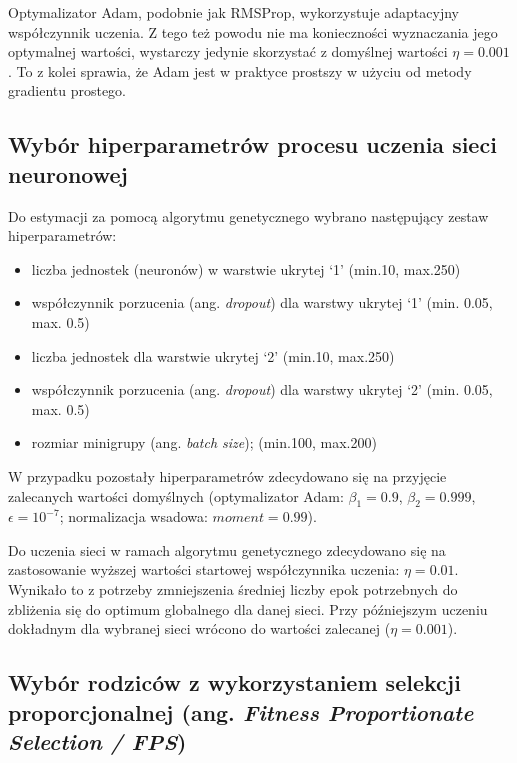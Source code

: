 \documentclass[a4paper,11pt]{article}
\begin{document}
    \bigskip

    Optymalizator Adam, podobnie jak RMSProp, wykorzystuje adaptacyjny współczynnik uczenia. Z tego też powodu nie ma konieczności wyznaczania jego optymalnej wartości, wystarczy jedynie skorzystać z domyślnej wartości $\eta = 0.001$\cite{UczenieMaszynowe2018}. To z kolei sprawia, że Adam jest w praktyce prostszy w użyciu od metody gradientu prostego.

    \subsection{Wybór hiperparametrów procesu uczenia sieci neuronowej}

    Do estymacji za pomocą algorytmu genetycznego wybrano następujący zestaw hiperparametrów:
    \begin{itemize}
        \item liczba jednostek (neuronów) w warstwie ukrytej `1' (min.10, max.250)
        \item współczynnik porzucenia (ang. \textit{dropout}) dla warstwy ukrytej `1' (min. 0.05, max. 0.5)
        \item liczba jednostek dla warstwie ukrytej `2' (min.10, max.250)
        \item współczynnik porzucenia (ang. \textit{dropout}) dla warstwy ukrytej `2' (min. 0.05, max. 0.5)
        \item rozmiar minigrupy (ang. \textit{batch size}); (min.100, max.200)
    \end{itemize}

    \bigskip

    W przypadku pozostały hiperparametrów zdecydowano się na przyjęcie zalecanych wartości domyślnych (optymalizator Adam: $\beta_{1} = 0.9$, $\beta_{2} = 0.999$, $\epsilon = 10^{-7}$; normalizacja wsadowa: $moment = 0.99$).

    \bigskip

    Do uczenia sieci w ramach algorytmu genetycznego zdecydowano się na zastosowanie wyższej wartości startowej współczynnika uczenia: $\eta = 0.01$. Wynikało to z potrzeby zmniejszenia średniej liczby epok potrzebnych do zbliżenia się do optimum globalnego dla danej sieci. Przy późniejszym uczeniu dokładnym dla wybranej sieci wrócono do wartości zalecanej ($\eta = 0.001$).

    \subsection{Wybór rodziców z wykorzystaniem selekcji proporcjonalnej (ang. \textit{Fitness Proportionate Selection / FPS})}
\end{document}

